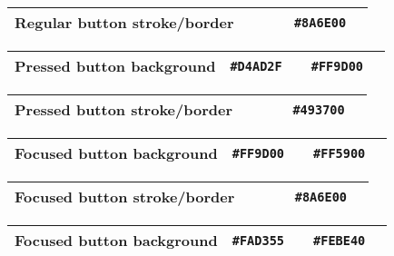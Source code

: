 \begin{table}[!htbp]
	\begin{tabularx}{\textwidth}{X r c r c}
		Regular button stroke/border 
		& ~ & ~
		& \texttt{\#8A6E00} & \cellcolor[HTML]{8A6E00}\phantom{--} \\ \hline
	\end{tabularx}
\end{table}

\begin{table}[!htbp]
	\begin{tabularx}{\textwidth}{X r c r c}
		Pressed button background 
		& \texttt{\#D4AD2F} & \cellcolor[HTML]{D4AD2F}\phantom{--}
		& \texttt{\#FF9D00} & \cellcolor[HTML]{FF9D00}\phantom{--} \\ \hline
	\end{tabularx}
\end{table}

\begin{table}[!htbp]
	\begin{tabularx}{\textwidth}{X r c r c}
		Pressed button stroke/border 
		& ~ & ~
		& \texttt{\#493700} & \cellcolor[HTML]{493700}\phantom{--} \\ \hline
	\end{tabularx}
\end{table}

\begin{table}[!htbp]
	\begin{tabularx}{\textwidth}{X r c r c}
		Focused button background 
		& \texttt{\#FF9D00} & \cellcolor[HTML]{FF9D00}\phantom{--}
		& \texttt{\#FF5900} & \cellcolor[HTML]{FF5900}\phantom{--} \\ \hline
	\end{tabularx}
\end{table}

\begin{table}[!htbp]
	\begin{tabularx}{\textwidth}{X r c r c}
		Focused button stroke/border 
		& ~ & ~
		& \texttt{\#8A6E00} & \cellcolor[HTML]{8A6E00}\phantom{--} \\ \hline
	\end{tabularx}
\end{table}

\begin{table}[!htbp]
	\begin{tabularx}{\textwidth}{X r c r c}
		Focused button background 
		& \texttt{\#FAD355} & \cellcolor[HTML]{FAD355}\phantom{--}
		& \texttt{\#FEBE40} & \cellcolor[HTML]{FEBE40}\phantom{--} \\ \hline
	\end{tabularx}
\end{table}

